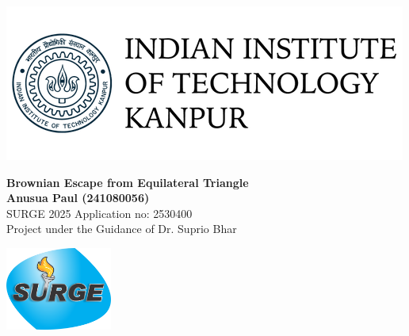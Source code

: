 \documentclass[a0,portrait]{a0poster}
\begin{document}
\begin{mdframed}[style=MyFrame]


%
\vspace*{-1cm} %

\noindent
\begin{minipage}[t]{0.2\linewidth}
  \raggedright
  \includegraphics[width=10 cm]{small_Indian_Institute_of_Technology_Kanpur_fbf2b0febe_0693117ed9.png}
\end{minipage}%
\begin{minipage}[t]{0.6\linewidth}
  \begin{center}
    \huge \color{SteelBlue} \textbf{Brownian Escape from Equilateral Triangle} \color{black}\\[1em]
    \Large \textbf{Anusua Paul (241080056)}\\[0.5em]
    \normalsize SURGE 2025 Application no: 2530400\\[0.5em]
    Project under the Guidance of Dr. Suprio Bhar
  \end{center}
\end{minipage}%
\begin{minipage}[t]{0.18\linewidth}
  \raggedleft
  \includegraphics[width=3.5cm]{surgelogo.png}
\end{minipage}



\end{mdframed}
\end{document}
